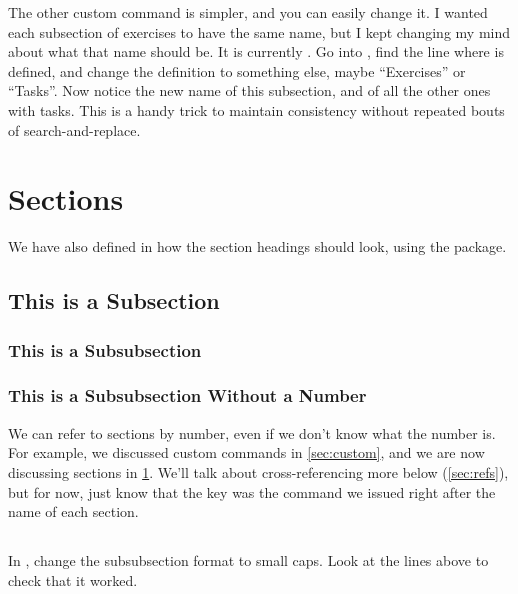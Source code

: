 \documentclass{article}
\begin{document}
The other custom command is simpler, and you can easily change it.
I wanted each subsection of exercises to have the same name, but I kept changing my mind about what that name should be.
It is currently \task.
Go into , find the line where \latexcode{\\task} is defined, and change the definition to something else, maybe ``Exercises'' or ``Tasks''.
Now notice the new name of this subsection, and of all the other ones with tasks.
This is a handy trick to maintain consistency without repeated bouts of search-and-replace.

\section{Sections}
\label{sec:sections}

We have also defined in  how the section headings should look, using the  package.

\subsection{This is a Subsection}

\subsubsection{This is a Subsubsection}

\subsubsection*{This is a Subsubsection Without a Number}

We can refer to sections by number, even if we don't know what the number is.
For example, we discussed custom commands in \cref{sec:custom}, and we are now discussing sections in \cref{sec:sections}.
We'll talk about cross-referencing more below (\cref{sec:refs}), but for now, just know that the key was the \latexcode{\\label} command we issued right after the name of each section.

\subsection{\task}

In , change the subsubsection format to small caps.
Look at the lines above to check that it worked.
\end{document}
